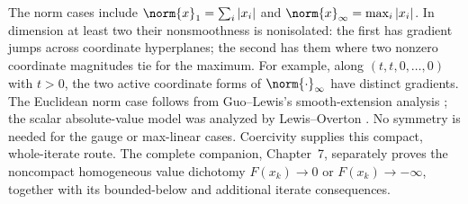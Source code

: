 The norm cases include $\norm{x}_1=\sum_i|x_i|$ and
$\norm{x}_\infty=\max_i|x_i|$. In dimension at least two their nonsmoothness
is nonisolated: the first has gradient jumps across coordinate hyperplanes;
the second has them where two nonzero coordinate magnitudes tie for the
maximum. For example, along $(t,t,0,\ldots,0)$ with $t>0$, the two active
coordinate forms of $\norm{\cdot}_\infty$ have distinct gradients. The
Euclidean norm case follows from Guo--Lewis's
smooth-extension analysis \cite[Corollary~4.2]{GL18}; the scalar absolute-value
model was analyzed by Lewis--Overton \cite[Section~5.1]{LO}. No symmetry is needed for the gauge or max-linear
cases. Coercivity supplies this compact, whole-iterate route. The complete companion,
Chapter~7, separately proves the noncompact homogeneous value dichotomy
$F(x_k)\to0$ or $F(x_k)\to-\infty$, together with its bounded-below and
additional iterate consequences.
